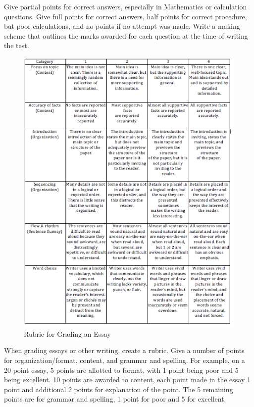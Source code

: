 Give partial points for correct answers, especially in Mathematics or calculation questions.  Give full points for correct answers, half points for correct procedure, but poor calculations, and no points if no attempt was made.  Write a making scheme that outlines the marks awarded for each question at the time of writing the test.

\begin{figure}[h!]
\begin{center}
\includegraphics[scale=.75]{./img/picture-10.png} 
\caption{Rubric for Grading an Essay}
\end{center}
\end{figure}

When grading essays or other writing, create a rubric.  Give a number of points for organization/format, content, and grammar and spelling.  For example, on a 20 point essay, 5 points are allotted to format, with 1 point being poor and 5 being excellent.  10 points are awarded to content, each point made in the essay 1 point and additional 2 points for explanation of the point.  The 5 remaining points are for grammar and spelling, 1 point for poor and 5 for excellent.


